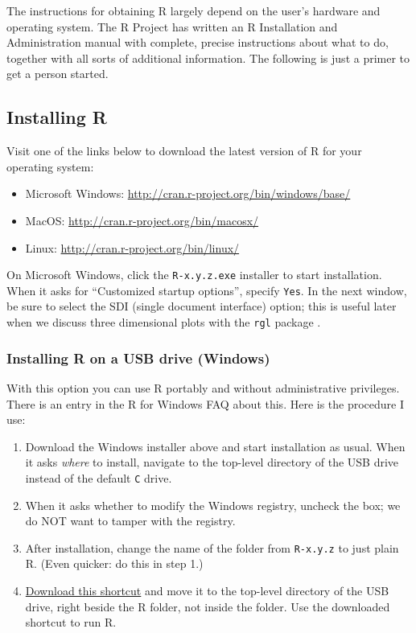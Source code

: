 \documentclass[]{book}
\providecommand{\tightlist}{%
  \setlength{\itemsep}{0pt}\setlength{\parskip}{0pt}}
\numberwithin{equation}{chapter}
\numberwithin{figure}{chapter}
\theoremstyle{plain}
\theoremstyle{definition}
\theoremstyle{remark}
\theoremstyle{definition}
\theoremstyle{definition}
\theoremstyle{remark}
\begin{document}
The instructions for obtaining R largely depend on the user's hardware
and operating system. The R Project has written an R Installation and
Administration manual with complete, precise instructions about what to
do, together with all sorts of additional information. The following is
just a primer to get a person started.

\subsection{Installing R}\label{installing-r}

Visit one of the links below to download the latest version of R for
your operating system:

\begin{itemize}
\tightlist
\item
  Microsoft Windows: \url{http://cran.r-project.org/bin/windows/base/}
\item
  MacOS: \url{http://cran.r-project.org/bin/macosx/}
\item
  Linux: \url{http://cran.r-project.org/bin/linux/}
\end{itemize}

On Microsoft Windows, click the \texttt{R-x.y.z.exe} installer to start
installation. When it asks for ``Customized startup options'', specify
\texttt{Yes}. In the next window, be sure to select the SDI (single
document interface) option; this is useful later when we discuss three
dimensional plots with the \texttt{rgl} package \autocite{rgl}.

\subsubsection{Installing R on a USB drive
(Windows)}\label{installing-r-on-a-usb-drive-windows}

With this option you can use R portably and without administrative
privileges. There is an entry in the R for Windows FAQ about this. Here
is the procedure I use:

\begin{enumerate}
\def\labelenumi{\arabic{enumi}.}
\tightlist
\item
  Download the Windows installer above and start installation as usual.
  When it asks \emph{where} to install, navigate to the top-level
  directory of the USB drive instead of the default \texttt{C} drive.
\item
  When it asks whether to modify the Windows registry, uncheck the box;
  we do NOT want to tamper with the registry.
\item
  After installation, change the name of the folder from
  \texttt{R-x.y.z} to just plain R. (Even quicker: do this in step 1.)
\item
  \href{http://ipsur.r-forge.r-project.org/book/download/R.exe}{Download
  this shortcut} and move it to the top-level directory of the USB
  drive, right beside the R folder, not inside the folder. Use the
  downloaded shortcut to run R.
\end{enumerate}
\end{document}
